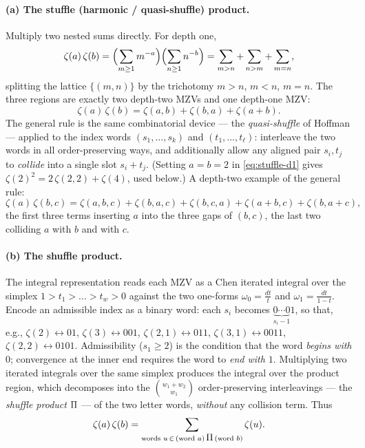 \documentclass[11pt]{article}
\newcommand{\shuffle}{\mathbin{\rotatebox[origin=c]{180}{\ensuremath{\amalg}}}}
\theoremstyle{plain}
\theoremstyle{remark}
\begin{document}
\paragraph{(a) The stuffle (harmonic / quasi-shuffle) product.}
Multiply two nested sums directly. For depth one,
\[
  \zeta(a)\,\zeta(b)=\Bigl(\sum_{m\ge1}m^{-a}\Bigr)\Bigl(\sum_{n\ge1}n^{-b}\Bigr)
  =\sum_{m>n}+\sum_{n>m}+\sum_{m=n},
\]
splitting the lattice $\{(m,n)\}$ by the trichotomy $m>n$, $m<n$, $m=n$. The three regions are exactly two depth-two MZVs and one depth-one MZV:
\begin{equation}
  \zeta(a)\,\zeta(b)=\zeta(a,b)+\zeta(b,a)+\zeta(a+b).
  \label{eq:stuffle-d1}
\end{equation}
The general rule is the same combinatorial device --- the \emph{quasi-shuffle} of Hoffman --- applied to the index words $(s_1,\dots,s_k)$ and $(t_1,\dots,t_\ell)$: interleave the two words in all order-preserving ways, and additionally allow any aligned pair $s_i,t_j$ to \emph{collide} into a single slot $s_i+t_j$. (Setting $a=b=2$ in \eqref{eq:stuffle-d1} gives $\zeta(2)^2=2\,\zeta(2,2)+\zeta(4)$, used below.) A depth-two example of the general rule:
\[
  \zeta(a)\,\zeta(b,c)=\zeta(a,b,c)+\zeta(b,a,c)+\zeta(b,c,a)
  +\zeta(a+b,c)+\zeta(b,a+c),
\]
the first three terms inserting $a$ into the three gaps of $(b,c)$, the last two colliding $a$ with $b$ and with $c$.

\paragraph{(b) The shuffle product.}
The integral representation reads each MZV as a Chen iterated integral over the simplex $1>t_1>\dots>t_w>0$ against the two one-forms $\omega_0=\tfrac{dt}{t}$ and $\omega_1=\tfrac{dt}{1-t}$. Encode an admissible index as a binary word: each $s_i$ becomes $\underbrace{0\cdots0}_{s_i-1}1$, so that, e.g., $\zeta(2)\leftrightarrow 01$, $\zeta(3)\leftrightarrow 001$, $\zeta(2,1)\leftrightarrow 011$, $\zeta(3,1)\leftrightarrow 0011$, $\zeta(2,2)\leftrightarrow 0101$. Admissibility ($s_1\ge2$) is the condition that the word \emph{begins with $0$}; convergence at the inner end requires the word to \emph{end with $1$}. Multiplying two iterated integrals over the same simplex produces the integral over the product region, which decomposes into the $\binom{w_1+w_2}{w_1}$ order-preserving interleavings --- the \emph{shuffle product} $\shuffle$ --- of the two letter words, \emph{without} any collision term. Thus
\begin{equation}
  \zeta(a)\,\zeta(b)=\sum_{\text{words }u\,\in\,(\text{word }a)\,\shuffle\,(\text{word }b)}\zeta(u).
  \label{eq:shuffle-gen}
\end{equation}
\end{document}
